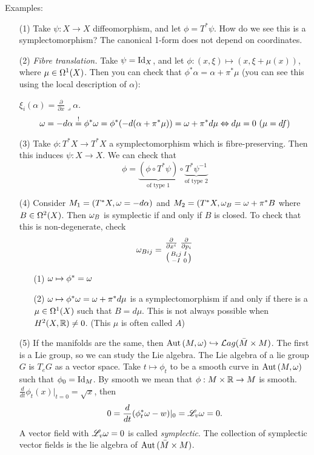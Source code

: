   Examples:
  \begin{itemize}
  \item[(1)] Take $\psi:X\to X$ diffeomorphism, and let
  $\phi=T^*\psi$.  How do we see this is a symplectomorphism?  The
  canonical 1-form does not depend on coordinates.

  \item[(2)] \emph{Fibre translation.} Take $\psi=\text{\rm Id}_X$, and let
  $\phi:(x,\xi)\mapsto (x,\xi+\mu(x))$, where $\mu\in \Omega^1(X)$.
  Then you can check that $\phi^*\alpha = \alpha + \pi^*\mu$ (you
  can see this using the local description of $\alpha$):

  $\xi_i(\alpha) = \frac{\partial}{\partial x} \lrcorner\alpha$.
  \[
    \w = -d\alpha \buildrel{!}\over{=} \phi^*\w = \phi^*(-d(\alpha
    + \pi^*\mu)) = \w+\pi^*d\mu \Leftrightarrow d\mu =0 \ (\mu=df)
  \]

  \item[(3)] Take $\phi:T^*X\to T^*X$ a symplectomorphism which is
  fibre-preserving.  Then this induces $\psi:X\to X$.  We can
  check that
  \[
    \phi = \underbrace{(\phi\circ T^*\psi)}_{\text{of type 1}}\circ
    \underbrace{T^*\psi^{-1}}_{\text{of type 2}}
  \]

  \item[(4)] Consider $M_1 = (T^*X,\omega=-d\alpha)$ and $M_2 =
  (T^*X,\omega_B = \omega+\pi^* B$ where $B\in \Omega^2(X)$.  Then $\omega_B$ is
  symplectic if and only if $B$ is closed.  To check that this is
  non-degenerate, check
  \[
    \w_{Bij} = {{\frac{\partial}{\partial x^i}\ \frac{\partial}{\partial
    p_i}}\atop{\matrix{B_ij}{I}{-I}{0}}}
  \]

  \begin{itemize}
  \item[(1)] $\omega\mapsto \phi^* = \omega$
  \item[(2)] $\omega \mapsto \phi^*\omega = \omega + \pi^*d\mu$ is a
  symplectomorphism if and only if there is a $\mu\in \Omega^1(X)$
  such that $B=d\mu$.  This is not always possible when
  $H^2(X,\mathbb{R})\not=0$.  (This $\mu$ is often called $A$)
  \end{itemize}

 \item[(5)] If the manifolds are the same, then $\text{\rm Aut}\,
 (M,\omega)\hookrightarrow \mathcal{L}ag(\bar M\times M)$.  The first is a Lie
 group, so we can study the Lie algebra.  The Lie algebra of a lie
 group $G$ is $T_eG$ as a vector space.  Take $t\mapsto \phi_t$ to be a
 smooth curve in $\text{\rm Aut}\,(M,\omega)$ such that $\phi_0=\text{\rm Id}_M$.  By smooth
 we mean that $\phi:M\times \mathbb{R}\to M$ is smooth.
 $\frac{d}{dt}\phi_t(x)|_{t=0} = \sqrt{x}$, then
 \[
    0 = \frac{d}{dt}(\phi^*_t\omega - w)|_0 = \mathscr{L}_v \omega = 0.
 \]
 A vector field with $\mathscr{L}_v\omega=0$ is called \emph{symplectic}.  The
 collection of symplectic vector fields is the lie algebra of
 $\text{\rm Aut}\,(\bar M\times M)$.


\end{itemize}
